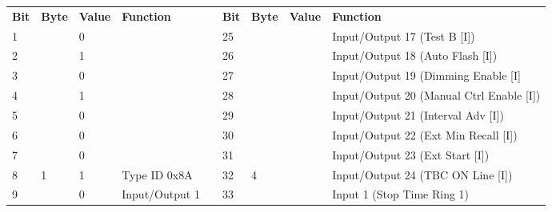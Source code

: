 \documentclass[]{article}
\begin{document}
\begin{landscape}
	\begin{table}[]
		\begin{tabular}{lllllllll}
			\cline{1-4} \cline{6-9}
			\textbf{Bit} & \textbf{Byte}       & \textbf{Value} & \textbf{Function}                       &                    & \textbf{Bit} & \textbf{Byte}       & \textbf{Value} & \textbf{Function}                         \\ \cline{1-4} \cline{6-9} 
			1            &                     & 0              &                                         &                    & 25           &                     &                & Input/Output 17 (Test B {[}I{]})          \\
			2            &                     & 1              &                                         &                    & 26           &                     &                & Input/Output 18 (Auto Flash {[}I{]})      \\
			3            &                     & 0              &                                         &                    & 27           &                     &                & Input/Output 19 (Dimming Enable {[}I{]}      \\
			4            &                     & 1              &                                         &                    & 28           &                     &                & Input/Output 20 (Manual Ctrl Enable {[}I{]}) \\
			5            &                     & 0              &                                         &                    & 29           &                     &                & Input/Output 21 (Interval Adv {[}I{]})    \\
			6            &                     & 0              &                                         &                    & 30           &                     &                & Input/Output 22 (Ext Min Recall {[}I{]})  \\
			7            &                     & 0              &                                         &                    & 31           &                     &                & Input/Output 23 (Ext Start {[}I{]})       \\
			8            & \multirow{-8}{*}{1} & 1              & \multirow{-8}{*}{Type ID 0x8A}          & \multirow{-9}{*}{} & 32           & \multirow{-8}{*}{4} &                & Input/Output 24 (TBC ON Line {[}I{]})     \\ \cline{1-4} \cline{6-9} 
			9            &                     & 0              & \cellcolor[HTML]{EFEFEF}Input/Output 1  &                    & 33           &                     &                & Input 1 (Stop Time Ring 1)                \\

\end{tabular}
\end{table}
\end{landscape}
\end{document}
